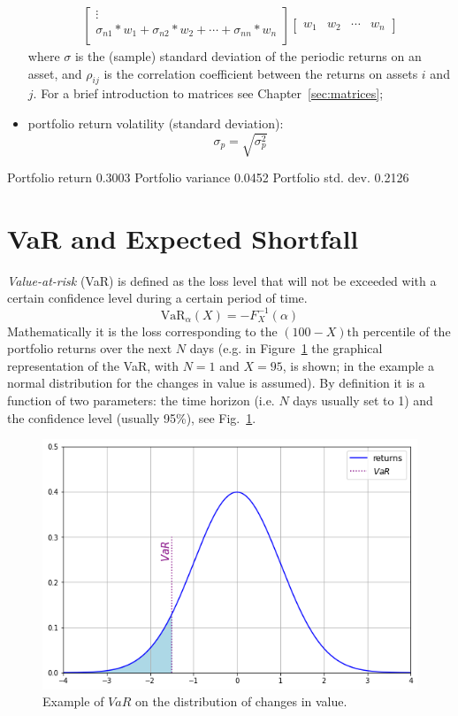 \begin{itemize}
\begin{equation}
\begin{aligned}
\begin{bmatrix}
				\vdots \\
				\sigma_{n1} *w_1 + \sigma_{n2}*w_2 + \cdots + \sigma_{nn}*w_n \\
			\end{bmatrix}
			\begin{bmatrix}
				w_1 & w_2 & \cdots & w_n
			\end{bmatrix}
		\end{aligned}
	\end{equation}
	where \(\sigma\) is the (sample) standard deviation of the periodic returns on an asset, and \(\rho _{ij}\) is the correlation coefficient between the returns on assets \(i\) and \(j\). For a brief introduction to matrices see Chapter~\ref{sec:matrices};
	\item
	portfolio return volatility (standard deviation):
	\begin{equation}
		\sigma _{p}= \sqrt{\sigma _{p}^{2}}
	\end{equation}
\end{itemize}

\begin{ioutput}
Portfolio return 0.3003
Portfolio variance 0.0452
Portfolio std. dev. 0.2126
\end{ioutput}

\section{VaR and Expected Shortfall}
\label{value-at-risk}

\emph{Value-at-risk} (VaR) is defined as the loss level that will not be exceeded with a certain confidence level during a certain period of time.
\begin{equation}
\text{VaR}_{\alpha}(X) = -F^{-1}_X(\alpha)
\label{eq:var}
\end{equation}
Mathematically it is the loss corresponding to the $(100-X)\textrm{th}$ percentile of the portfolio returns over the next $N$ days (e.g. in Figure~\ref{fig:var_loss} the graphical representation of the VaR, with $N=1$ and $X=95$, is shown; in the example a normal distribution for the changes in value is assumed). By definition it is a function of two parameters: the time horizon (i.e. $N$ days usually set to 1) and the confidence level (usually 95\%), see Fig.~\ref{fig:var_loss}. 

\begin{figure}[htb]
\centering
\includegraphics[width=0.6\linewidth]{figures/95_var}
\caption{Example of $VaR$ on the distribution of changes in value.}
\label{fig:var_loss}
\end{figure}

